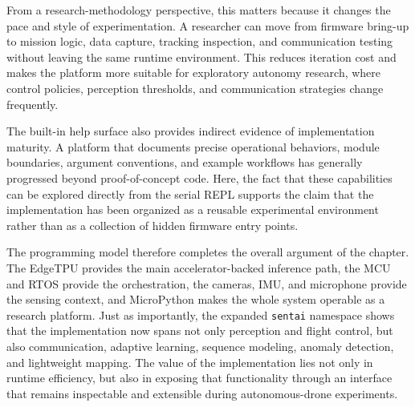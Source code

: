 From a research-methodology perspective, this matters because it changes
the pace and style of experimentation. A researcher can move from
firmware bring-up to mission logic, data capture, tracking inspection,
and communication testing without leaving the same runtime environment.
This reduces iteration cost and makes the platform more suitable for
exploratory autonomy research, where control policies, perception
thresholds, and communication strategies change frequently.

The built-in help surface also provides indirect evidence of
implementation maturity. A platform that documents precise operational
behaviors, module boundaries, argument conventions, and example
workflows has generally progressed beyond proof-of-concept code. Here,
the fact that these capabilities can be explored directly from the
serial REPL supports the claim that the implementation has been
organized as a reusable experimental environment rather than as a
collection of hidden firmware entry points.

The programming model therefore completes the overall argument of the
chapter. The EdgeTPU provides the main accelerator-backed inference
path, the MCU and RTOS provide the orchestration, the cameras, IMU, and
microphone provide the sensing context, and MicroPython makes the whole
system operable as a research platform. Just as importantly, the
expanded \texttt{sentai} namespace shows that the implementation now
spans not only perception and flight control, but also communication,
adaptive learning, sequence modeling, anomaly detection, and lightweight
mapping. The value of the implementation lies not only in runtime
efficiency, but also in exposing that functionality through an interface
that remains inspectable and extensible during autonomous-drone
experiments.
